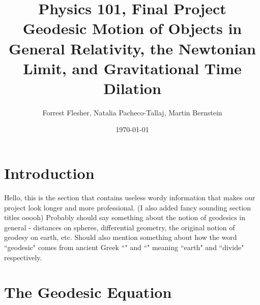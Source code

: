 \documentclass[12pt]{article}
\title{Physics 101, Final Project \\ \Large Geodesic Motion of Objects in General Relativity, the Newtonian Limit, and Gravitational Time Dilation
}
\date{\today}
\author{Forrest Flesher, Natalia Pacheco-Tallaj, Martin Bernstein }
\theoremstyle{definition}
\theoremstyle{remark}
\begin{document}
\maketitle

\section*{Introduction}
Hello, this is the section that contains useless wordy information that makes our project look longer and more professional.  (I also added fancy sounding section titles ooooh)  Probably should say something about the notion of geodesics in general - distances on spheres, differential geometry, the original notion of geodesy on earth, etc.  Should also mention something about how the word ``geodesic" comes from ancient Greek ``\textgamma \texteta " and ``\textdelta \textiota \textalpha \textiota \textrho \textepsilon \textomega "  meaning ``earth" and ``divide" respectively.  

\section{The Geodesic Equation}
\end{document}
